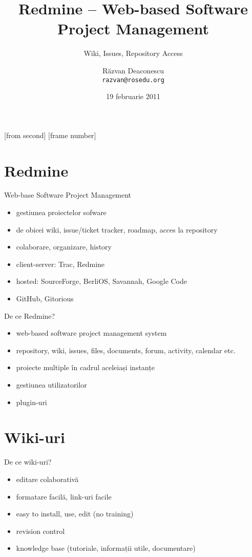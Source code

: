 \documentclass{beamer}
\title[Redmine]{Redmine -- Web-based Software Project Management}
\subtitle{Wiki, Issues, Repository Access}
\institute[ROSEdu]{ROSEdu}
\date{19 februarie 2011}
\author{Răzvan Deaconescu \\ \texttt{razvan@rosedu.org}}
\begin{document}
[from second]
[frame number]

\frame{\titlepage}

\frame{\tableofcontents}

\section{Redmine}

\begin{frame}{Web-base Software Project Management}
  \begin{itemize}
    \item gestiunea proiectelor sofware
    \item de obicei wiki, issue/ticket tracker, roadmap, acces la repository
    \item colaborare, organizare, history
    \item client-server: Trac, Redmine
    \item hosted: SourceForge, BerliOS, Savannah, Google Code
    \item GitHub, Gitorious
  \end{itemize}
\end{frame}

\begin{frame}{De ce Redmine?}
  \begin{itemize}
    \item web-based software project management system
    \item repository, wiki, issues, files, documents, forum, activity,
calendar etc.
    \item proiecte multiple în cadrul aceleiași instanțe
    \item gestiunea utilizatorilor
    \item plugin-uri
  \end{itemize}
\end{frame}

\section{Wiki-uri}

\begin{frame}{De ce wiki-uri?}
  \begin{itemize}
    \item editare colaborativă
    \item formatare facilă, link-uri facile
    \item easy to install, use, edit (no training)
    \item revision control
    \item knowledge base (tutoriale, informații utile, documentare)
  \end{itemize}
\end{frame}
\end{document}
